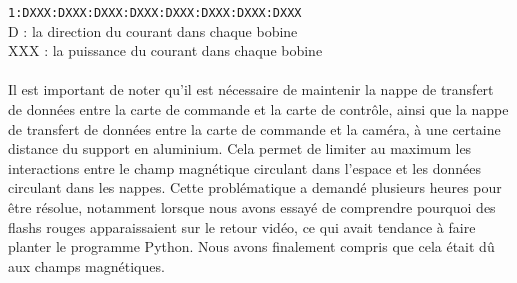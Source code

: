 \documentclass{article}
\begin{document}
        \tabto{1cm}\verb+1:DXXX:DXXX:DXXX:DXXX:DXXX:DXXX:DXXX:DXXX+
        \\
        D : la direction du courant dans chaque bobine
        \\
        XXX : la puissance du courant dans chaque bobine
        \\\\
Il est important de noter qu'il est nécessaire de maintenir la nappe de transfert de données entre la carte de commande et la carte de contrôle, ainsi que la nappe de transfert de données entre la carte de commande et la caméra, à une certaine distance du support en aluminium. Cela permet de limiter au maximum les interactions entre le champ magnétique circulant dans l'espace et les données circulant dans les nappes. Cette problématique a demandé plusieurs heures pour être résolue, notamment lorsque nous avons essayé de comprendre pourquoi des flashs rouges apparaissaient sur le retour vidéo, ce qui avait tendance à faire planter le programme Python. Nous avons finalement compris que cela était dû aux champs magnétiques.


\newpage
\end{document}

